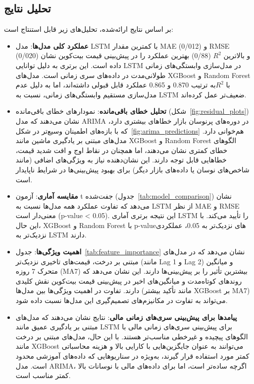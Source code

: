 \subsection{تحلیل نتایج}
بر اساس نتایج ارائه‌شده، تحلیل‌های زیر قابل استنتاج است:

\begin{itemize}
	\item \textbf{عملکرد کلی مدل‌ها}: مدل LSTM با کمترین مقدار MAE (0/012) و RMSE (0/020) و بالاترین $ R^2 $ (0/88) بهترین عملکرد را در پیش‌بینی قیمت بیت‌کوین نشان داده است. این برتری به دلیل توانایی LSTM در مدل‌سازی وابستگی‌های زمانی طولانی‌مدت در داده‌های سری زمانی است. مدل‌های XGBoost و Random Forest با $ R^2 $به ترتیب 0.870 و 0.865 عملکرد قابل قبولی داشته‌اند، اما به دلیل عدم مدل‌سازی مستقیم وابستگی‌های زمانی، نسبت به LSTM ضعیف‌تر عمل کرده‌اند.
	
	\item \textbf{تحلیل خطای باقی‌مانده}: نمودارهای خطای باقی‌مانده (شکل~\ref{fig:residual_plots}) نشان می‌دهند که مدل ARIMA در دوره‌های پرنوسان بازار خطاهای بیشتری دارد، که با بازه‌های اطمینان وسیع‌تر در شکل~\ref{fig:arima_predictions} هم‌خوانی دارد. مدل‌های مبتنی بر یادگیری ماشین مانند XGBoost و Random Forest الگوهای خطای کمتری نشان می‌دهند، اما همچنان در نقاط اوج و افت شدید قیمت، خطاهایی قابل توجه دارند. این نشان‌دهنده نیاز به ویژگی‌های اضافی (مانند شاخص‌های نوسان یا داده‌های بازار دیگر) برای بهبود پیش‌بینی‌ها در شرایط ناپایدار است.
	
	\item \textbf{مقایسه آماری}: آزمون t جفت‌شده (جدول~\ref{tab:model_comparison}) نشان می‌دهد که تفاوت عملکرد همه مدل‌ها نسبت به LSTM از نظر MAE و RMSE معنی‌دار است (p-value < 0.05). این نتیجه برتری آماری LSTM را تأیید می‌کند. با این حال، XGBoost و Random Forest با p-value‌های نزدیک‌تر به 0.05، عملکردی نزدیک‌تر به LSTM دارند.
	
	\item \textbf{اهمیت ویژگی‌ها}: جدول~\ref{tab:feature_importance} نشان می‌دهد که در مدل‌های مبتنی بر درخت، قیمت‌های تاخیری نزدیک‌تر (مانند Lag 1 و Lag 2) و میانگین متحرک 7 روزه (MA7) بیشترین تأثیر را بر پیش‌بینی‌ها دارند. این نشان می‌دهد که روندهای کوتاه‌مدت و میانگین‌های اخیر در پیش‌بینی قیمت بیت‌کوین نقش کلیدی دارند. تفاوت در اهمیت ویژگی‌ها بین مدل‌ها (مانند تأکید بیشتر XGBoost بر MA7) می‌تواند به تفاوت در مکانیزم‌های تصمیم‌گیری این مدل‌ها نسبت داده شود.
	
	\item \textbf{پیامدها برای پیش‌بینی سری‌های زمانی مالی}: نتایج نشان می‌دهند که مدل‌های مبتنی بر یادگیری عمیق مانند LSTM برای پیش‌بینی سری‌های زمانی مالی با الگوهای پیچیده و غیرخطی مناسب‌تر هستند. با این حال، مدل‌های مبتنی بر درخت مانند XGBoost می‌توانند به عنوان جایگزین‌هایی با کارایی بالا و هزینه محاسباتی کمتر مورد استفاده قرار گیرند، به‌ویژه در سناریوهایی که داده‌های آموزشی محدود است. مدل ARIMA، اگرچه ساده‌تر است، اما برای داده‌های مالی با نوسانات بالا کمتر مناسب است.
	

\end{itemize}
